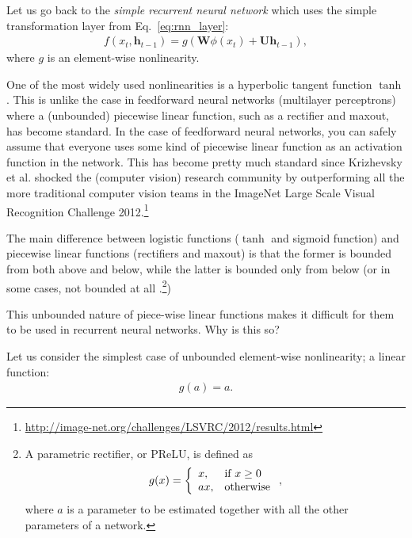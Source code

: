 \documentclass{report}
\newcommand{\vect}[1]{\mathbf{#1}}
\newcommand{\matr}[1]{\mathbf{#1}}
\newcommand{\vh}[0]{\vect{h}}
\newcommand{\mW}[0]{\matr{W}}
\newcommand{\mU}[0]{\matr{U}}
\newcommand{\II}[0]{\mathbb{I}}
\begin{document}
Let us go back to the {\em simple recurrent neural network} which uses the
simple transformation layer from Eq.~\eqref{eq:rnn_layer}:
\begin{align*}
    f(x_t, \vh_{t-1}) = g(\mW \phi(x_t) + \mU \vh_{t-1}),
\end{align*}
where $g$ is an element-wise nonlinearity. 

One of the most widely used nonlinearities is a hyperbolic tangent function
$\tanh$. This is unlike the case in feedforward neural networks (multilayer
perceptrons) where a (unbounded) piecewise linear function, such as a rectifier
and maxout, has become standard. In the case of feedforward neural networks, you
can safely assume that everyone uses some kind of piecewise linear function as
an activation function in the network. This has become pretty much standard
since Krizhevsky et al. \cite{krizhevsky2012imagenet} shocked the (computer
vision) research community by outperforming all the more traditional computer
vision teams in the ImageNet Large Scale Visual Recognition Challenge
2012.\footnote{
    \url{http://image-net.org/challenges/LSVRC/2012/results.html}
}

The main difference between logistic functions
($\tanh$ and sigmoid function) and piecewise linear functions (rectifiers and
maxout) is that the former is bounded from both above and below, while the
latter is bounded only from below (or in some cases, not bounded at all
\cite{he2015delving}.\footnote{
    A parametric rectifier, or PReLU, is defined as
    \begin{align*}
        g(x) = \left\{ 
            \begin{array}{l l}
                x, & \text{if }x \geq 0 \\
                ax, & \text{otherwise}
            \end{array}
            \right.,
    \end{align*}
    where $a$ is a parameter to be estimated together with all the other
    parameters of a network.
})

This unbounded nature of piece-wise linear functions makes it difficult for them
to be used in recurrent neural networks. Why is this so?

Let us consider the simplest case of unbounded element-wise nonlinearity; a
linear function:
\begin{align*}
    g(a) = a.
\end{align*}
\end{document}
